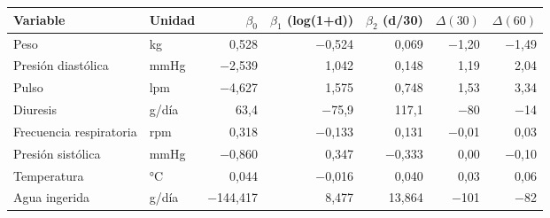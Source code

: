\begin{tabular}{llrrrrr}\toprule
 Variable & Unidad & $\beta_0$ & $\beta_1$ (log(1+d)) & $\beta_2$ (d/30) & $\Delta(30)$ & $\Delta(60)$ \\
\midrule
Peso & kg & 0,528 & −0,524 & 0,069 & −1,20 & −1,49 \\
Presión diastólica & mmHg & −2,539 & 1,042 & 0,148 & 1,19 & 2,04 \\
Pulso & lpm & −4,627 & 1,575 & 0,748 & 1,53 & 3,34 \\
Diuresis & g/día & 63,4 & −75,9 & 117,1 & −80 & −14 \\
Frecuencia respiratoria & rpm & 0,318 & −0,133 & 0,131 & −0,01 & 0,03 \\
Presión sistólica & mmHg & −0,860 & 0,347 & −0,333 & 0,00 & −0,10 \\
Temperatura & °C & 0,044 & −0,016 & 0,040 & 0,03 & 0,06 \\
Agua ingerida & g/día & −144,417 & 8,477 & 13,864 & −101 & −82 \\
\bottomrule\end{tabular}
